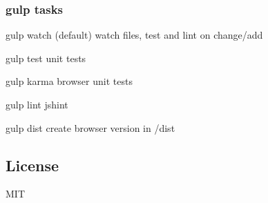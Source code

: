 \subsubsection*{gulp tasks}


\begin{DoxyItemize}
\item {\ttfamily gulp watch} (default) watch files, test and lint on change/add
\item {\ttfamily gulp test} unit tests
\item {\ttfamily gulp karma} browser unit tests
\item {\ttfamily gulp lint} jshint
\item {\ttfamily gulp dist} create browser version in /dist
\end{DoxyItemize}

\subsection*{License}

M\+IT 
